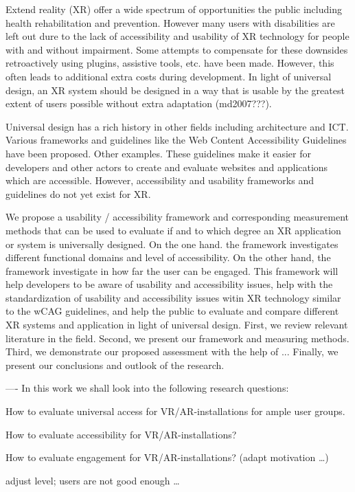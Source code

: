 \documentclass[11pt,english]{nik}
\begin{document}
Extend reality (XR) offer a wide spectrum of opportunities the public including health rehabilitation and prevention. However many users with disabilities are left out dure to the lack of accessibility and usability of XR technology for people with and without impairment. Some attempts to compensate for these downsides retroactively using plugins, assistive tools, etc. have been made. However, this often leads to additional extra costs during development. In light of universal design, an XR system should be designed in a way that is usable by the greatest extent of users possible without extra adaptation (md2007???).

Universal design has a rich history in other fields including architecture and ICT. Various frameworks and guidelines like the Web Content Accessibility Guidelines have been proposed. Other examples. These guidelines make it easier for developers and other actors to create and evaluate websites and applications which are accessible. However, accessibility and usability frameworks and guidelines do not yet exist for XR.

We propose a usability / accessibility framework and corresponding measurement methods that can be used to evaluate if and to which degree an XR application or system is universally designed. On the one hand. the framework investigates different functional domains and level of accessibility. On the other hand, the framework investigate in how far the user can be engaged. This framework will help developers to be aware of usability and accessibility issues, help with the standardization of usability and accessibility issues witin XR technology similar to the wCAG guidelines, and help the public to evaluate and compare different XR systems and application in light of universal design.
First, we review relevant literature in the field.
Second, we present our framework and measuring methods.
Third, we demonstrate our proposed assessment with the help of ...
Finally, we present our conclusions and outlook of the research.


----
In this work we shall look into the following research questions:
\begin{enumerate*}[label={\alph*)},ref=\alph*]
\item How to evaluate universal access for VR/AR-installations for ample user groups.
\item How to evaluate accessibility for VR/AR-installations? 
\item How to evaluate engagement for VR/AR-installations? (adapt motivation \dots)
\item adjust level; users are not good enough \dots
\end{enumerate*}
\end{document}
